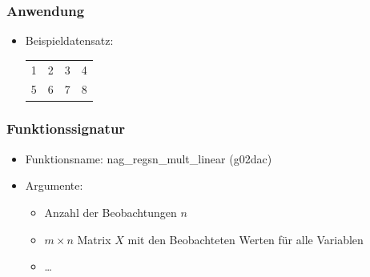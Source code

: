 \documentclass{beamer}
\begin{document}
\begin{frame}
  \frametitle{Anwendung}
  \begin{itemize}
  \item Beispieldatensatz:\\
    \begin{tabular}[h]{c|c|c|c}
      1 & 2 & 3 & 4 \\
      5 & 6 & 7 & 8
    \end{tabular}
  \end{itemize}

\end{frame}

\begin{frame}
  \frametitle{Funktionssignatur}
  
  \begin{itemize}
  \item Funktionsname: nag\_regsn\_mult\_linear (g02dac)
  \item Argumente:
    \begin{itemize}
    \item Anzahl der Beobachtungen $n$
    \item $m \times n$ Matrix $X$ mit den Beobachteten Werten für alle Variablen
    \item \dots
    \end{itemize}
  \end{itemize}

\end{frame}
\end{document}
